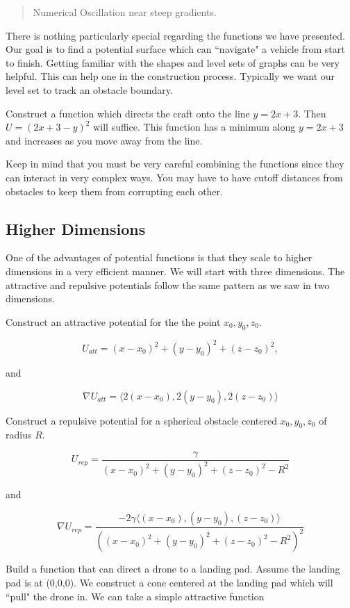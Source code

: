\begin{quote}
Numerical Oscillation near steep gradients.
\end{quote}

There is nothing particularly special regarding the functions we have
presented. Our goal is to find a potential surface which can ``navigate"
a vehicle from start to finish. Getting familiar with the shapes and
level sets of graphs can be very helpful. This can help one in the
construction process. Typically we want our level set to track an
obstacle boundary.

Construct a function which directs the craft onto the line
\(y = 2x + 3\). Then \(U = (2x+3-y)^2\) will suffice. This function has
a minimum along \(y = 2x + 3\) and increases as you move away from the
line.

Keep in mind that you must be very careful combining the functions since
they can interact in very complex ways. You may have to have cutoff
distances from obstacles to keep them from corrupting each other.

\hypertarget{higher-dimensions}{%
\subsection{Higher Dimensions}\label{higher-dimensions}}

One of the advantages of potential functions is that they scale to
higher dimensions in a very efficient manner. We will start with three
dimensions. The attractive and repulsive potentials follow the same
pattern as we saw in two dimensions.

Construct an attractive potential for the the point \(x_0,y_0,z_0\).

\[U_{att} = (x-x_0)^2 + (y-y_0)^2 + (z-z_0)^2,\]

and

\[\nabla U_{att} = \langle 2(x-x_0) , 2(y-y_0) , 2(z-z_0)\rangle\]

Construct a repulsive potential for a spherical obstacle centered
\(x_0,y_0,z_0\) of radius \(R\).

\[U_{rep} = \displaystyle \frac{\gamma}{(x-x_0)^2 + (y-y_0)^2 + (z-z_0)^2 - R^2}\]

and

\[\nabla U_{rep} = \displaystyle \frac{-2\gamma \langle (x-x_0) , (y-y_0) ,  (z-z_0)\rangle}{\left( (x-x_0)^2 + (y-y_0)^2 + (z-z_0)^2 - R^2\right)^2}\]

Build a function that can direct a drone to a landing pad. Assume the
landing pad is at (0,0,0). We construct a cone centered at the landing
pad which will ``pull" the drone in. We can take a simple attractive
function

